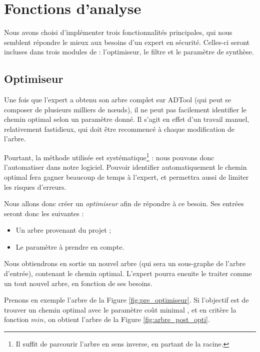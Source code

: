 \section{Fonctions d'analyse}

	Nous avons choisi d'implémenter trois fonctionnalités principales, qui nous semblent répondre le mieux aux besoins d'un expert en sécurité. Celles-ci seront incluses dans trois modules de \glasir{} : l'optimiseur, le filtre et le paramètre de synthèse. 

	\subsection{Optimiseur}
		\label{subsection:optimiseur}

		Une fois que l'expert a obtenu son arbre complet sur ADTool (qui peut se composer de plusieurs milliers de nœuds), il ne peut pas facilement identifier le chemin optimal selon un paramètre donné. Il s'agit en effet d'un travail manuel, relativement fastidieux, qui doit être recommencé à chaque modification de l'arbre.
		
		Pourtant, la méthode utilisée est systématique\footnote{Il suffit de parcourir l'arbre en sens inverse, en partant de la racine.} : nous pouvons donc l'automatiser dans notre logiciel. Pouvoir identifier automatiquement le chemin optimal fera gagner beaucoup de temps à l'expert, et permettra aussi de limiter les risques d'erreurs.

		Nous allons donc créer un \textit{optimiseur} afin de répondre à ce besoin.
		Ses entrées seront donc les suivantes :
		\begin{itemize}
			\item Un arbre provenant du projet ;
			\item Le paramètre à prendre en compte.
		\end{itemize}
		Nous obtiendrons en sortie un nouvel arbre (qui sera un sous-graphe de l'arbre d'entrée), contenant le chemin optimal. L'expert pourra ensuite le traiter comme un tout nouvel arbre, en fonction de ses besoins.
		
		Prenons en exemple l'arbre de la {\sc Figure} \ref{fig:pre_optimiseur}. Si l'objectif est de trouver un chemin optimal avec le paramètre \og coût minimal \fg{}, et en critère la fonction $min$, on obtient l'arbre de la {\sc Figure} \ref{fig:arbre_post_opti}.
		
